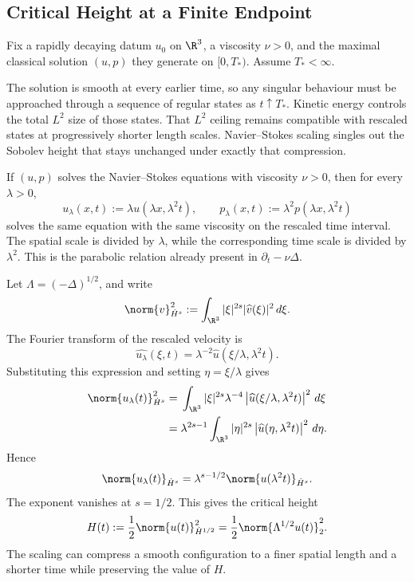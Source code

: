 
\subsection{Critical Height at a Finite Endpoint}\label{sub:CriticalHeightAtAFiniteEndpoint}

Fix a rapidly decaying datum \(u_0\) on \(\R^3\), a viscosity \(\nu>0\), and the maximal classical solution \((u,p)\) they generate on \([0,T_*)\).
Assume \(T_*<\infty\).

The solution is smooth at every earlier time, so any singular behaviour must be approached through a sequence of regular states as \(t\uparrow T_*\).
Kinetic energy controls the total \(L^2\) size of those states.
That \(L^2\) ceiling remains compatible with rescaled states at progressively shorter length scales.
Navier--Stokes scaling singles out the Sobolev height that stays unchanged under exactly that compression.

If \((u,p)\) solves the Navier--Stokes equations with viscosity \(\nu>0\), then for every \(\lambda>0\),
\[
  u_\lambda(x,t)
  :=
  \lambda u(\lambda x,\lambda^2t),
  \qquad
  p_\lambda(x,t)
  :=
  \lambda^2p(\lambda x,\lambda^2t)
\]
solves the same equation with the same viscosity on the rescaled time interval.
The spatial scale is divided by \(\lambda\), while the corresponding time scale is divided by \(\lambda^2\).
This is the parabolic relation already present in \(\partial_t-\nu\Delta\).

Let \(\Lambda=(-\Delta)^{1/2}\), and write
\[
  \norm{v}_{\dot H^s}^2
  :=
  \int_{\R^3}
  |\xi|^{2s}|\widehat v(\xi)|^2
  \,d\xi.
\]
The Fourier transform of the rescaled velocity is
\[
  \widehat{u_\lambda}(\xi,t)
  =
  \lambda^{-2}
  \widehat u(\xi/\lambda,\lambda^2t).
\]
Substituting this expression and setting \(\eta=\xi/\lambda\) gives
\begin{align*}
  \norm{u_\lambda(t)}_{\dot H^s}^2
  &={}
  \int_{\R^3}
  |\xi|^{2s}\lambda^{-4}
  \left|\widehat u(\xi/\lambda,\lambda^2t)\right|^2
  \,d\xi
  \\
  &={}
  \lambda^{2s-1}
  \int_{\R^3}
  |\eta|^{2s}
  \left|\widehat u(\eta,\lambda^2t)\right|^2
  \,d\eta.
\end{align*}
Hence
\[
  \norm{u_\lambda(t)}_{\dot H^s}
  =
  \lambda^{s-1/2}
  \norm{u(\lambda^2t)}_{\dot H^s}.
\]
The exponent vanishes at \(s=1/2\).
This gives the critical height
\[
  H(t)
  :=
  \frac12\norm{u(t)}_{\dot H^{1/2}}^2
  =
  \frac12\norm{\Lambda^{1/2}u(t)}_2^2.
\]
The scaling can compress a smooth configuration to a finer spatial length and a shorter time while preserving the value of \(H\).

